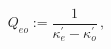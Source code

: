 \begin{equation}
Q_{eo}:={\frac{1}{\kappa _{e}^{\prime }-\kappa _{o}^{\prime }}}\,,
\end{equation}

